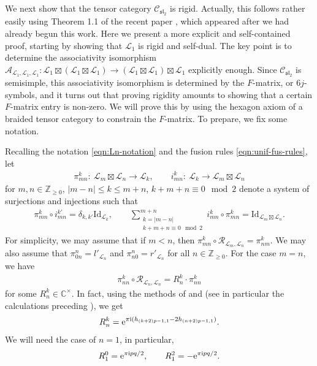 \documentclass[pdftex]{sigma}
\numberwithin{equation}{section}
\theoremstyle{definition}
\begin{document}
We next show that the tensor category $\mathcal{C}_{\mathfrak{sl}_2}$ is rigid. Actually, this follows rather easily using Theorem 1.1 of the recent paper \cite{EP}, which appeared after we had already begun this work. Here we present a more explicit and self-contained proof, starting by showing that $\mathcal{L}_1$ is rigid and self-dual. The key point is to determine the associativity isomorphism $\mathcal{A}_{\mathcal{L}_1,\mathcal{L}_1,\mathcal{L}_1}\colon \mathcal{L}_1\boxtimes(\mathcal{L}_1\boxtimes\mathcal{L}_1)\rightarrow(\mathcal{L}_1\boxtimes\mathcal{L}_1)\boxtimes\mathcal{L}_1$ explicitly enough. Since $\mathcal{C}_{\mathfrak{sl}_2}$ is semisimple, this associativity isomorphism is determined by the $F$-matrix, or $6j$-symbols, and it turns out that proving rigidity amounts to showing that a certain $F$-matrix entry is non-zero. We will prove this by using the hexagon axiom of a braided tensor category to constrain the $F$-matrix. To prepare, we fix some notation.

Recalling the notation \eqref{eqn:Ln-notation} and the fusion rules \eqref{eqn:unif-fus-rules}, let
\begin{gather*}
\pi^k_{mn}\colon\ \mathcal{L}_m\boxtimes\mathcal{L}_n\longrightarrow\mathcal{L}_k,\qquad i_{mn}^k\colon\ \mathcal{L}_k\longrightarrow\mathcal{L}_m\boxtimes\mathcal{L}_n
\end{gather*}
for $m,n\in\mathbb{Z}_{\geq 0}$, $\vert m-n\vert\leq k\leq m+n$, $k+m+n\equiv 0 \mod 2$ denote a system of surjections and injections such that
\begin{gather}\label{eqn:proj-system}
\pi^k_{mn}\circ i^{k'}_{mn} =\delta_{k,k'}\mathrm{Id}_{\mathcal{L}_k},\qquad \sum_{\substack{k=\vert m-n\vert\\ k+m+n\equiv 0 \mod 2}}^{m+n} i_{mn}^k\circ\pi_{mn}^k =\mathrm{Id}_{\mathcal{L}_m\boxtimes\mathcal{L}_n}.
\end{gather}
For simplicity, we may assume that if $m<n$, then $\pi^k_{mn}\circ\mathcal{R}_{\mathcal{L}_m,\mathcal{L}_n}=\pi^k_{nm}$. We may also assume that $\pi_{0n}^n = l'_{\mathcal{L}_n}$ and $\pi_{n0}^n=r'_{\mathcal{L}_n}$ for all $n\in\mathbb{Z}_{\geq 0}$. For the case $m=n$, we have
\begin{gather*}
\pi_{nn}^k\circ\mathcal{R}_{\mathcal{L}_n,\mathcal{L}_n} = R_n^k\cdot\pi_{nn}^k
\end{gather*}
for some $R_n^k\in\mathbb{C}^\times$. In fact, using the methods of \cite[Sections 7 and 8]{GaNe} and \cite[Section 6]{MY-25-Vir} (see in particular the calculations preceding \cite[Theorem 6.3]{MY-25-Vir}), we get
\begin{gather*}
R_n^k ={\rm e}^{\pi {\rm i}(h_{(k+2)p-1,1}-2h_{(n+2)p-1,1})}.
\end{gather*}
We will need the case of $n=1$, in particular,
\begin{gather}\label{eqn:r-values}
R_1^0 = {\rm e}^{\pi {\rm i} pq/2},\qquad R_1^2 = - {\rm e}^{\pi {\rm i} pq/2}.
\end{gather}
\end{document}
